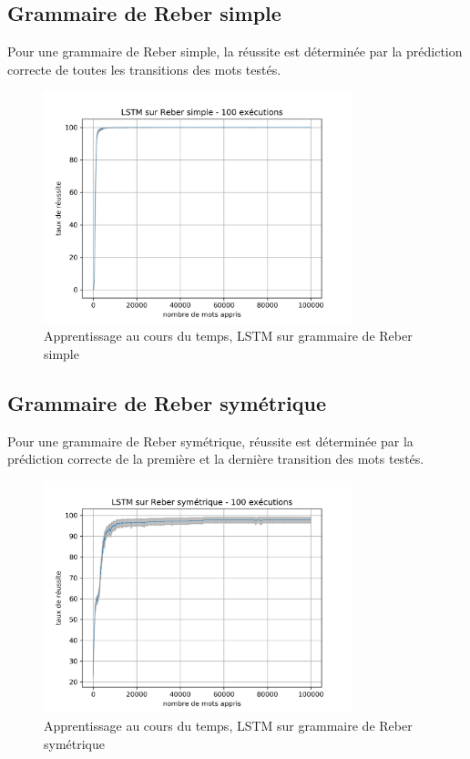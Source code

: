\subsection{Grammaire de Reber simple}
Pour une grammaire de Reber simple, la réussite est déterminée par la prédiction
correcte de toutes les transitions des mots testés.

\begin{figure}[!ht]
\begin{center}
\includegraphics[width=0.8\textwidth]{images/results/lstm_simplereber_ls30_lr01.png}
\caption{Apprentissage au cours du temps, LSTM sur grammaire de Reber simple}
\end{center}
\end{figure}

\subsection{Grammaire de Reber symétrique}
Pour une grammaire de Reber symétrique, réussite est déterminée par la prédiction
correcte de la première et la dernière transition des mots testés.

\begin{figure}[!ht]
\begin{center}
\includegraphics[width=0.8\textwidth]{images/results/lstm_doublereber_ls30_lr01.png}
\caption{Apprentissage au cours du temps, LSTM sur grammaire de Reber symétrique}
\end{center}
\end{figure}
